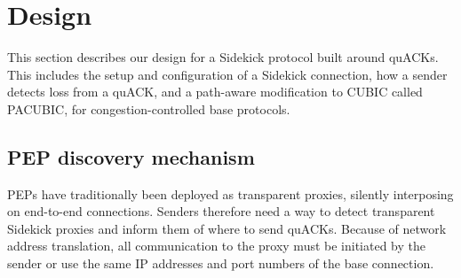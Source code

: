 \section{Design}
\label{sec:sidekick:init}

This section describes our design for a Sidekick protocol built around
quACKs. This includes the setup and configuration of a Sidekick
connection, how a sender detects loss from a quACK, and a path-aware
modification to CUBIC called PACUBIC, for congestion-controlled base
protocols.





\subsection{PEP discovery mechanism}

PEPs have traditionally been deployed as transparent proxies, silently
interposing on end-to-end connections. Senders therefore need a way to detect
transparent Sidekick proxies and inform them of where to send quACKs.  Because
of network address translation, all communication to the proxy must be
initiated by the sender or use the same IP addresses and port numbers of the
base connection.

